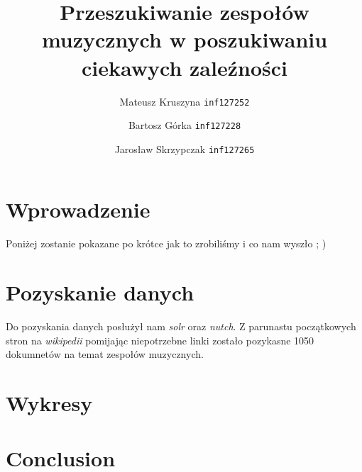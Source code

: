 \documentclass[journal]{IEEEtran}
\begin{document}
\title{Przeszukiwanie zespołów muzycznych w poszukiwaniu ciekawych zaleźności}
\author{
    Mateusz Kruszyna \texttt{inf127252}\\
    \and
    Bartosz Górka \texttt{inf127228}\\
    \and
    Jarosław Skrzypczak \texttt{inf127265}
}
\maketitle
\IEEEpeerreviewmaketitle

\section{Wprowadzenie}
Poniżej zostanie pokazane po krótce jak to zrobiliśmy i co nam wyszło ; )

\section{Pozyskanie danych}
Do pozyskania danych posłużył nam \textit{solr} oraz \textit{nutch}.
Z parunastu początkowych stron na \textit{wikipedii} pomijając niepotrzebne linki
 zostało pozykasne 1050 dokumnetów na temat zespołów muzycznych.

\section{Wykresy}

\newcommand{\namefile}{../Lucene_project/results/cat_loc/cat_loc_American_blues_rock.csv}
\newcommand{\titleplot}{My first plot}


\renewcommand{\namefile}{../Lucene_project/results/cat_loc/cat_loc_American_blues.csv}
\renewcommand{\titleplot}{My first plot22}



\section{Conclusion}
\blindtext
\end{document}
